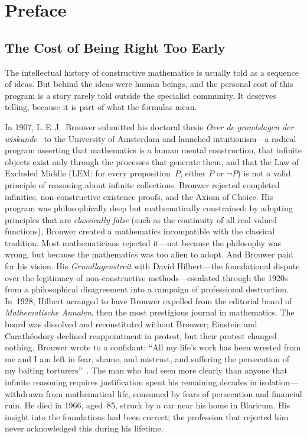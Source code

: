 \documentclass[11pt,a4paper]{report}
\theoremstyle{plain}
\theoremstyle{definition}
\theoremstyle{remark}
\newcommand{\LEM}{\mathrm{LEM}}
\begin{document}
\chapter*{Preface}

\section*{The Cost of Being Right Too Early}

The intellectual history of constructive mathematics is usually told as a sequence of ideas. But behind the ideas were human beings, and the personal cost of this program is a story rarely told outside the specialist community. It deserves telling, because it is part of what the formulas mean.

In 1907, L.\,E.\,J.\ Brouwer submitted his doctoral thesis \emph{Over de grondslagen der wiskunde}~\cite{Brouwer1907} to the University of Amsterdam and launched intuitionism---a radical program asserting that mathematics is a human mental construction, that infinite objects exist only through the processes that generate them, and that the Law of Excluded Middle ($\LEM$: for every proposition~$P$, either $P$ or $\neg P$) is not a valid principle of reasoning about infinite collections. Brouwer rejected completed infinities, non-constructive existence proofs, and the Axiom of Choice. His program was philosophically deep but mathematically constrained: by adopting principles that are \emph{classically false} (such as the continuity of all real-valued functions), Brouwer created a mathematics incompatible with the classical tradition. Most mathematicians rejected it---not because the philosophy was wrong, but because the mathematics was too alien to adopt. And Brouwer paid for his vision. His \emph{Grundlagenstreit} with David Hilbert---the foundational dispute over the legitimacy of non-constructive methods---escalated through the 1920s from a philosophical disagreement into a campaign of professional destruction. In~1928, Hilbert arranged to have Brouwer expelled from the editorial board of \emph{Mathematische Annalen}, then the most prestigious journal in mathematics. The board was dissolved and reconstituted without Brouwer; Einstein and Carath\'eodory declined reappointment in protest, but their protest changed nothing. Brouwer wrote to a confidant: ``All my life's work has been wrested from me and I am left in fear, shame, and mistrust, and suffering the persecution of my baiting torturers''~\cite{vanDalen2005}. The man who had seen more clearly than anyone that infinite reasoning requires justification spent his remaining decades in isolation---withdrawn from mathematical life, consumed by fears of persecution and financial ruin. He died in 1966, aged~85, struck by a car near his home in Blaricum. His insight into the foundations had been correct; the profession that rejected him never acknowledged this during his lifetime.
\end{document}
